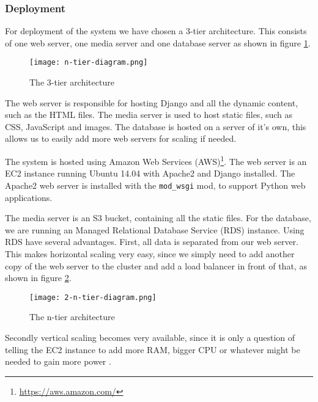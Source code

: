 \subsubsection*{Deployment}

For deployment of the system we have chosen a 3-tier architecture. This consists of one web server, one media server and one database server as shown in figure \ref{fig:3-tier}. 

\begin{figure}[H]
\capstart
	\centering
		\texttt{[image: n-tier-diagram.png]}
	\caption[]{The 3-tier architecture \label{fig:3-tier}}
\end{figure}

The web server is responsible for hosting Django and all the dynamic content, such as the HTML files. The media server is used to host static files, such as CSS, JavaScript and images. The database is hosted on a server of it's own, this allows us to easily add more web servers for scaling if needed.

The system is hosted using Amazon Web Services (AWS)\footnote{\url{https://aws.amazon.com/}}. The web server is an EC2 instance running Ubuntu 14.04 with Apache2 and Django installed. The Apache2 web server is installed with the \texttt{mod\_wsgi} mod, to support Python web applications. 

The media server is an S3 bucket, containing all the static files. For the database, we are running an Managed Relational Database Service (RDS) instance. Using RDS have several advantages. First, all data is separated from our web server. This makes horizontal scaling very easy, since we simply need to add another copy of the web server to the cluster and add a load balancer in front of that, as shown in figure \ref{fig:n-tier}.

\begin{figure}[H]
\capstart
	\centering
		\texttt{[image: 2-n-tier-diagram.png]}
	\caption[]{The n-tier architecture \label{fig:n-tier}}
\end{figure}

Secondly vertical scaling becomes very available, since it is only a question of telling the EC2 instance to add more RAM, bigger CPU or whatever might be needed to gain more power \cite[p.~204]{henderson2006building}. 


